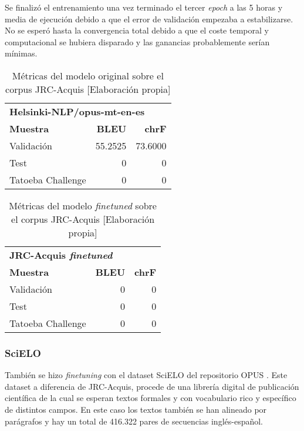 Se finalizó el entrenamiento una vez terminado el tercer \textit{epoch} a las 5 horas y media de ejecución debido a que el error de validación empezaba a estabilizarse. No se esperó hasta la convergencia total debido a que el coste temporal y computacional se hubiera disparado y las ganancias probablemente serían mínimas.

\begin{table}[H]
    \begin{center}
        \begin{tabular}{ l r r }
        \multicolumn{3}{l}{\textbf{Helsinki-NLP/opus-mt-en-es}}\\
        \textbf{Muestra} & \textbf{BLEU} & \textbf{chrF} \\
        Validación & 55.2525 & 73.6000 \\
        Test & 0 & 0 \\
        Tatoeba Challenge & 0 & 0
        \end{tabular}
        \caption{Métricas del modelo original sobre el corpus JRC-Acquis [Elaboración propia]}\label{originalacquis}
    \end{center}
\end{table}

\begin{table}[H]
    \begin{center}
        \begin{tabular}{ l r r }
        \multicolumn{3}{l}{\textbf{JRC-Acquis \textit{finetuned}}}\\
        \textbf{Muestra} & \textbf{BLEU} & \textbf{chrF} \\
        Validación & 0 & 0 \\ %
        Test & 0 & 0 \\
        Tatoeba Challenge & 0 & 0
        \end{tabular}
        \caption{Métricas del modelo \textit{finetuned} sobre el corpus JRC-Acquis [Elaboración propia]}\label{finetuneacquis}
    \end{center}
\end{table}


\subsubsection{SciELO}
También se hizo \textit{finetuning} con el dataset SciELO del repositorio OPUS \cite{CORPUS}. Este dataset a diferencia de JRC-Acquis, procede de una librería digital de publicación científica de la cual se esperan textos formales y con vocabulario rico y específico de distintos campos. En este caso los textos también se han alineado por parágrafos y hay un total de 416.322 pares de secuencias inglés-español.

